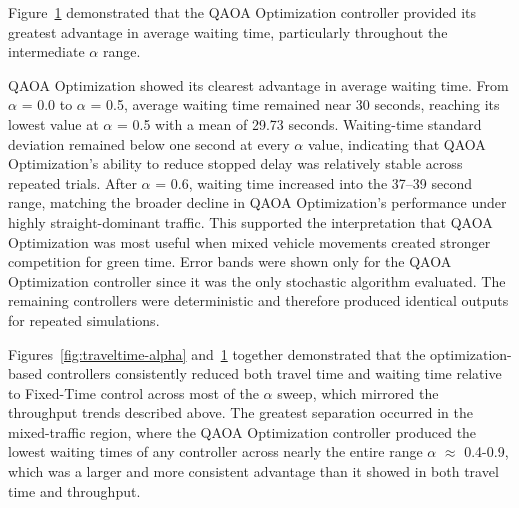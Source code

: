 \documentclass[12pt]{article}
\begin{document}
\begin{figure}[htbp]
\label{fig:waitingtime-alpha}
\end{figure}

Figure~\ref{fig:waitingtime-alpha} demonstrated that the QAOA Optimization controller provided its greatest advantage in average waiting time, particularly throughout the intermediate $\alpha$ range.

QAOA Optimization showed its clearest advantage in average waiting time. From $\alpha$ = 0.0 to $\alpha$ = 0.5, average waiting time remained near 30 seconds, reaching its lowest value at $\alpha$ = 0.5 with a mean of 29.73 seconds. Waiting-time standard deviation remained below one second at every $\alpha$ value, indicating that QAOA Optimization’s ability to reduce stopped delay was relatively stable across repeated trials. After $\alpha$ = 0.6, waiting time increased into the 37–39 second range, matching the broader decline in QAOA Optimization’s performance under highly straight-dominant traffic. This supported the interpretation that QAOA Optimization was most useful when mixed vehicle movements created stronger competition for green time. Error bands were shown only for the QAOA Optimization controller since it was the only stochastic algorithm evaluated. The remaining controllers were deterministic and therefore produced identical outputs for repeated simulations.

Figures~\ref{fig:traveltime-alpha} and~\ref{fig:waitingtime-alpha} together demonstrated that the optimization-based controllers consistently reduced both travel time and waiting time relative to Fixed-Time control across most of the $\alpha$ sweep, which mirrored the throughput trends described above. The greatest separation occurred in the mixed-traffic region, where the QAOA Optimization controller produced the lowest waiting times of any controller across nearly the entire range $\alpha$ $\approx$ 0.4-0.9, which was a larger and more consistent advantage than it showed in both travel time and throughput. 
\end{document}
